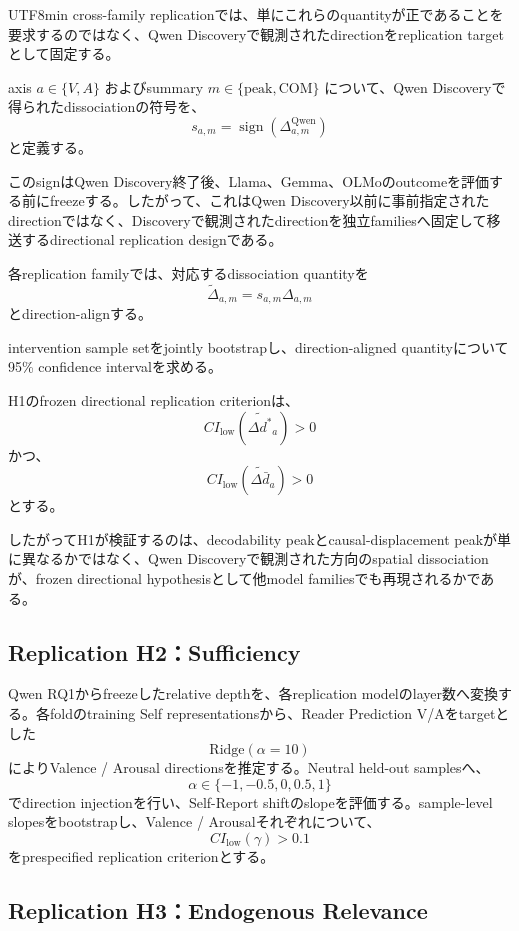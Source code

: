 \documentclass{article} %
\begin{document}
\begin{CJK*}{UTF8}{min}
cross-family replicationでは、単にこれらのquantityが正であることを要求するのではなく、Qwen Discoveryで観測されたdirectionをreplication targetとして固定する。

axis \(a\in\{V,A\}\) およびsummary \(m\in\{\mathrm{peak},\mathrm{COM}\}\) について、Qwen Discoveryで得られたdissociationの符号を、
\[
s_{a,m}
=
\operatorname{sign}
\left(
\Delta_{a,m}^{\mathrm{Qwen}}
\right)
\]
と定義する。

このsignはQwen Discovery終了後、Llama、Gemma、OLMoのoutcomeを評価する前にfreezeする。したがって、これはQwen Discovery以前に事前指定されたdirectionではなく、Discoveryで観測されたdirectionを独立familiesへ固定して移送するdirectional replication designである。

各replication familyでは、対応するdissociation quantityを
\[
\widetilde{\Delta}_{a,m}
=
s_{a,m}\Delta_{a,m}
\]
とdirection-alignする。

intervention sample setをjointly bootstrapし、direction-aligned quantityについて95\% confidence intervalを求める。

H1のfrozen directional replication criterionは、
\[
CI_{\mathrm{low}}
\left(
\widetilde{\Delta d^{*}}_a
\right)>0
\]
かつ、
\[
CI_{\mathrm{low}}
\left(
\widetilde{\Delta\bar d}_a
\right)>0
\]
とする。

したがってH1が検証するのは、decodability peakとcausal-displacement peakが単に異なるかではなく、Qwen Discoveryで観測された方向のspatial dissociationが、frozen directional hypothesisとして他model familiesでも再現されるかである。

\subsection{Replication H2：Sufficiency}

Qwen RQ1からfreezeしたrelative depthを、各replication modelのlayer数へ変換する。各foldのtraining Self representationsから、Reader Prediction V/Aをtargetとした
\[
\text{Ridge}(\alpha=10)
\]
によりValence / Arousal directionsを推定する。Neutral held-out samplesへ、
\[
\alpha
\in
\{
-1,-0.5,0,0.5,1
\}
\]
でdirection injectionを行い、Self-Report shiftのslopeを評価する。sample-level slopesをbootstrapし、Valence / Arousalそれぞれについて、
\[
CI_{\mathrm{low}}(\gamma)>0.1
\]
をprespecified replication criterionとする。


\subsection{Replication H3：Endogenous Relevance}


\end{CJK*}
\end{document}
